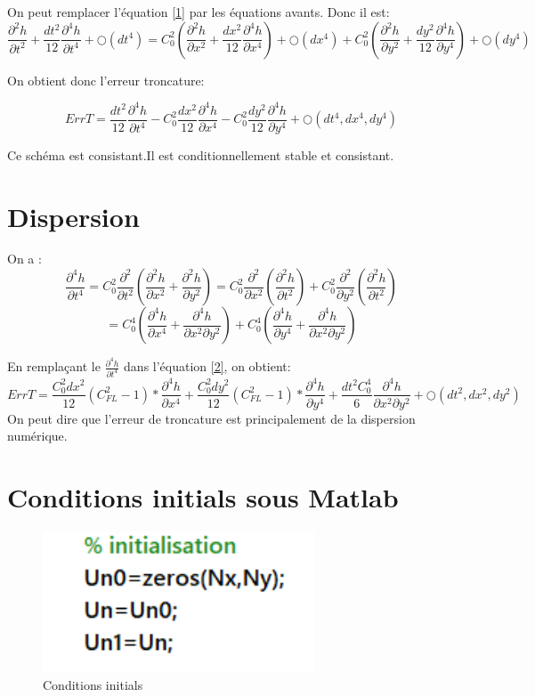 \documentclass[a4paper,10pt]{report} %
\begin{document}
On peut remplacer l'équation \ref{1} par les équations avants. Donc il est:
$$\frac{\partial^{2}h}{\partial t^{2}}+\frac{dt^{2}}{12}\frac{\partial^{4}h}{\partial t^{4}}+\bigcirc(dt^{4})=C^{2}_{0}(\frac{\partial^{2}h}{\partial x^{2}}+\frac{dx^{2}}{12}\frac{\partial^{4}h}{\partial x^{4}})+\bigcirc(dx^{4})+C^{2}_{0}(\frac{\partial^{2}h}{\partial y^{2}}+\frac{dy^{2}}{12}\frac{\partial^{4}h}{\partial y^{4}})+\bigcirc(dy^{4})$$

On obtient donc l'erreur troncature:

\begin{equation}
ErrT=\frac{dt^{2}}{12}\frac{\partial^{4}h}{\partial t^{4}}-C^{2}_{0}\frac{dx^{2}}{12}\frac{\partial^{4}h}{\partial x^{4}}-C^{2}_{0}\frac{dy^{2}}{12}\frac{\partial^{4}h}{\partial y^{4}}+\bigcirc(dt^{4},dx^{4},dy^{4})
\label{2}
\end{equation}

Ce schéma est consistant.Il est conditionnellement stable et consistant.

\section{Dispersion}
On a :
$$\frac
{\partial^{4}h}{\partial t^{4}}=C_{0}^{2}\frac{\partial^{2}}{\partial t ^{2}}(\frac{\partial^{2}h}{\partial x^{2}}+\frac{\partial^{2}h}{\partial y^{2}})=C_{0}^{2}\frac{\partial^{2}}{\partial x ^{2}}(\frac{\partial^{2}h}{\partial t^{2}})+C_{0}^{2}\frac{\partial^{2}}{\partial y ^{2}}(\frac{\partial^{2}h}{\partial t^{2}})$$$$=C_{0}^{4}(\frac{\partial^{4}h}{\partial x^{4}}+\frac{\partial^{4}h}{\partial x^{2}\partial y^{2}})+C_{0}^{4}(\frac{\partial^{4}h}{\partial y^{4}}+\frac{\partial^{4}h}{\partial x^{2}\partial y^{2}})
$$

En remplaçant le $\frac
{\partial^{4}h}{\partial t^{4}}$ dans l'équation \ref{2}, on obtient:
$$ErrT=\frac{C_0^2dx^2}{12}(C_{FL}^2-1)*\frac{\partial^{4}h}{\partial x^{4}}+\frac{C_0^2dy^2}{12}(C_{FL}^2-1)*\frac{\partial^{4}h}{\partial y^{4}}+\frac{dt^2C_0^4}{6}\frac{\partial^{4}h}{\partial x^{2}\partial y^{2}}+\bigcirc(dt^{2},dx^{2},dy^{2})$$
On peut dire que l'erreur de troncature est principalement de la dispersion numérique.



\section{Conditions initials sous Matlab}
\begin{figure}[h]
\centering
\includegraphics[width=0.72\textwidth]{fig/figure4.png}
\caption{Conditions initials}
\label{initial}
\end{figure}
\end{document}
